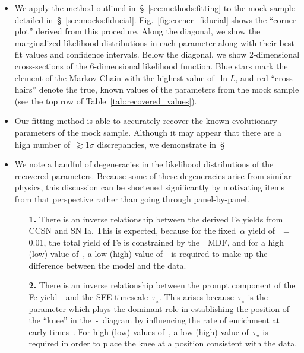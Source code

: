\documentclass[ms.tex]{subfiles}
\begin{document}
\begin{itemize}

	\item We apply the method outlined in~\S~\ref{sec:methods:fitting} to the
	mock sample detailed in~\S~\ref{sec:mocks:fiducial}.
	Fig.~\ref{fig:corner_fiducial} shows the ``corner-plot'' derived from this
	procedure.
	Along the diagonal, we show the marginalized likelihood distributions in
	each parameter along with their best-fit values and confidence intervals.
	Below the diagonal, we show 2-dimensional cross-sections of the
	6-dimensional likelihood function.
	Blue stars mark the element of the Markov Chain with the highest value
	of~$\ln L$, and red ``cross-hairs'' denote the true, known values of the
	parameters from the mock sample (see the top row of
	Table~\ref{tab:recovered_values}).

	\item Our fitting method is able to accurately recover the known
	evolutionary parameters of the mock sample.
	Although it may appear that there are a high number of~$\gtrsim1\sigma$
	discrepancies, we demonstrate in~\S~

	\item We note a handful of degeneracies in the likelihood distributions of
	the recovered parameters.
	{\color{red}
	Because some of these degeneracies arise from similar physics, this
	discussion can be shortened significantly by motivating items from that
	perspective rather than going through panel-by-panel.
	}

	\begin{itemize}

		\item[\textbf{1.}] There is an inverse relationship between the
		derived Fe yields from CCSN and SN Ia.
		This is expected, because for the fixed~$\alpha$ yield of~\yacc~= 0.01,
		the total yield of Fe is constrained by the~\feh~MDF, and for a high
		(low) value of~\yfecc, a low (high) value of~\yfeia~is required to
		make up the difference between the model and the data.

		\item[\textbf{2.}] There is an inverse relationship between the prompt
		component of the Fe yield~\yfecc~and the SFE timescale~$\tau_\star$.
		This arises because~$\tau_\star$ is the parameter which plays the
		dominant role in establishing the position of the ``knee'' in
		the~\afe-\feh~diagram by influencing the rate of enrichment at early
		times~\citep[see discussion in][]{Weinberg2017}.
		For high (low) values of~\yfecc, a low (high) value of~$\tau_\star$ is
		required in order to place the knee at a position consistent with the
		data.


\end{itemize}
\end{itemize}
\end{document}
